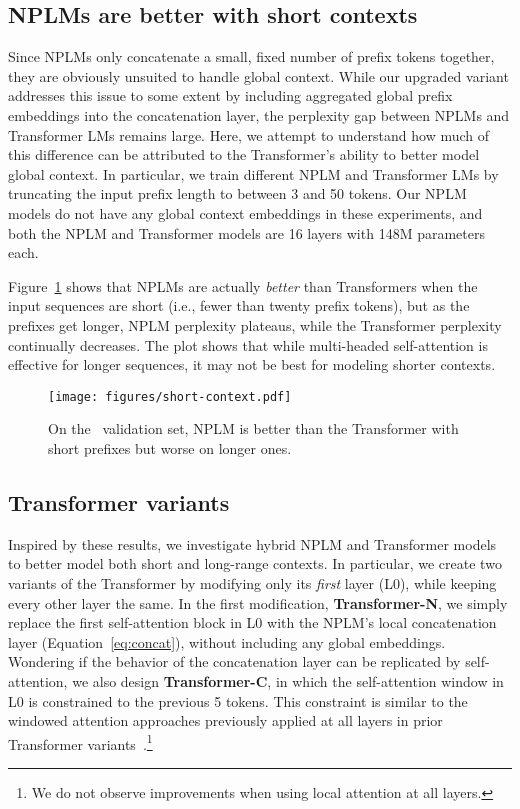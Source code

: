 \documentclass[11pt]{article}
\begin{document}
\subsection{NPLMs are better with short contexts} \label{sec:short-context}
Since NPLMs only concatenate a small, fixed number of prefix tokens together, they are obviously unsuited to handle global context. While our upgraded variant addresses this issue to some extent by including aggregated global prefix embeddings into the concatenation layer, the perplexity gap between NPLMs and Transformer LMs remains large. Here, we attempt to understand how much of this difference can be attributed to the Transformer's ability to better model global context. In particular, we train different NPLM and Transformer LMs by truncating the input prefix length to between 3 and 50 tokens. Our NPLM models do not have any global context embeddings in these experiments, and both the NPLM and Transformer models are 16 layers with 148M parameters each.

Figure~\ref{fig:short-context-l0-constrain} shows that NPLMs are actually \emph{better} than Transformers when the input sequences are short (i.e., fewer than twenty prefix tokens), but as the prefixes get longer, NPLM perplexity plateaus, while the Transformer perplexity continually decreases. The plot shows that while multi-headed self-attention is effective for longer sequences, it may not be best for modeling shorter contexts.

\begin{figure} [t]
    \centering \texttt{[image: figures/short-context.pdf]} 
    \caption{On the \wtthree\ validation set, NPLM is better than the Transformer with short prefixes but worse on longer ones. 
    }
    \label{fig:short-context-l0-constrain}
\end{figure}


\subsection{Transformer variants}

Inspired by these results, we investigate hybrid NPLM and Transformer models to better model both short and long-range contexts. In particular, we create two variants of the Transformer by modifying only its \emph{first} layer (L0), while keeping every other layer the same. In the first modification, \textbf{Transformer-N}, we simply replace the first self-attention block in L0 with the NPLM's local concatenation layer (Equation~\ref{eq:concat}), without including any global embeddings. Wondering if the behavior of the concatenation layer can be replicated by self-attention, we also design \textbf{Transformer-C}, in which the self-attention window in L0 is constrained to the previous 5 tokens. 
This constraint is similar to the windowed attention approaches previously applied at all layers in prior Transformer variants~\citep{Beltagy2020Longformer,Roy2020EfficientCS}.\footnote{We do not observe improvements when using local attention at all layers.} 
\end{document}
